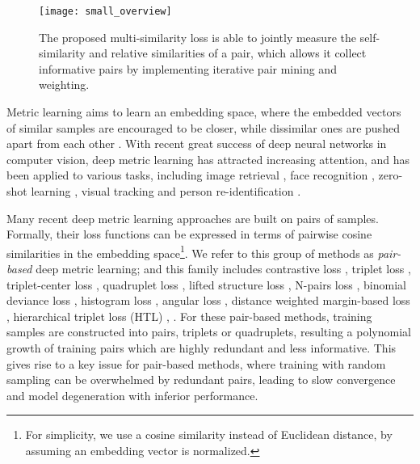 \documentclass[10pt,twocolumn,letterpaper]{article}
\begin{document}
\begin{figure}[t]
	\vspace{10pt}
	\centering
	\texttt{[image: small\_overview]}
	\caption{\small The proposed multi-similarity loss is able to jointly measure the self-similarity and relative similarities of a pair, which allows it collect informative pairs by implementing iterative pair mining and weighting.}
	\label{overview}
	\vspace{-10pt}
\end{figure}
Metric learning aims to learn an embedding space, where the embedded vectors of similar samples are encouraged to be closer, while dissimilar ones are pushed apart from each other \cite{lowe1995similarity,mika1999fisher,xing2003distance}.
With recent great success of deep neural networks in computer vision, deep metric learning has attracted increasing attention,
and has been applied to various tasks, including image retrieval \cite{wohlhart2015learning,He_2018_CVPR,Grabner_2018_CVPR}, face recognition \cite{Wen2016},
zero-shot learning \cite{zhang2016zero,bucher2016improving,Yelamarthi_2018_ECCV}, visual tracking \cite{leal2016learning,tao2016siamese} and person re-identification \cite{Yu_2018_ECCV,in-defense}.

Many recent deep metric learning approaches are built on pairs of samples. Formally, their loss functions can be expressed in terms of pairwise cosine similarities in the embedding space{\footnote {For simplicity, we use a cosine similarity instead of Euclidean distance, by assuming an embedding vector is  normalized.}}. We refer to this group of methods as {\it pair-based} deep metric learning; and this family includes contrastive loss \cite{contrastive}, triplet loss \cite{Hoffer2015DeepML}, triplet-center loss \cite{He_2018_CVPR}, quadruplet loss \cite{quadruplet}, lifted structure loss \cite{lifted-structured-loss}, N-pairs loss \cite{n-pairs}, binomial deviance loss \cite{binomial}, histogram loss \cite{histogram}, angular loss \cite{angular}, distance weighted margin-based loss \cite{sampling}, hierarchical triplet loss (HTL) \cite{HTL}, \etc.
For these pair-based methods, training samples are constructed into pairs, triplets or quadruplets, resulting a polynomial growth of training pairs which are highly redundant and less informative.
This gives rise to a key issue for pair-based methods, where training with random sampling can be overwhelmed by redundant pairs, leading to slow convergence and model degeneration with inferior performance.
\end{document}
